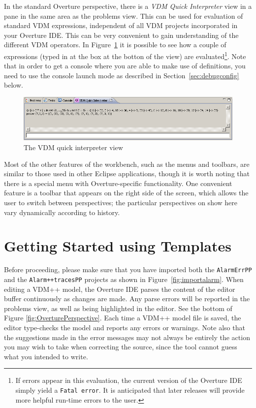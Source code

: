 In the standard Overture perspective, there is a \emph{VDM Quick   Interpreter} view in a pane in the same area as the problems view. This can be used for evaluation of standard VDM expressions, independent of all VDM projects incorporated in your Overture IDE. This can be very convenient to gain understanding of the different VDM operators. In Figure~\ref{fig:QuickIntView} it is possible to see how a couple of expressions (typed in at the box at the botton of the view) are evaluated\footnote{If errors appear in this evaluation, the current version of the Overture IDE simply yield a \texttt{Fatal error}.  It is anticipated that later releases will provide more helpful run-time errors to the user.}. Note that in order to get a console where you are able to make use of definitions, you need to use the console launch mode as described in Section~\ref{sec:debugconfig} below.
%
\begin{figure}[!htb]
\begin{center}
  \includegraphics[width=4.5in]{figures/quickinterpreter}
  \caption[labelInTOC]{The VDM quick interpreter view}
  \label{fig:QuickIntView}
\end{center}
\end{figure}
%
Most of the other features of the workbench, such as the menus and toolbars, are similar to those used in other Eclipse applications, though it is worth noting that there is a special menu with Overture-specific functionality. One convenient feature is a toolbar that appears on the right side of the screen, which allows the user to switch between perspectives; the particular perspectives on show here vary dynamically according to history.
%
\section{Getting Started using Templates}\label{sec:templates}
Before proceeding, please make sure that you have imported both the \texttt{AlarmErrPP} and the \texttt{Alarm++tracesPP} projects as shown in Figure~\ref{fig:importalarm}. When editing a VDM++ model, the Overture IDE parses the content of the editor buffer continuously as changes are made. Any parse errors will be reported in the problems view, as well as being highlighted in the editor. See the bottom of Figure \ref{fig:OverturePerspective}. Each time a VDM++ model file is saved, the editor type-checks the model and reports any errors or warnings. Note also that the suggestions made in the error messages may not always be entirely the action you may wish to take when correcting the source, since the tool cannot guess what you intended to write.


